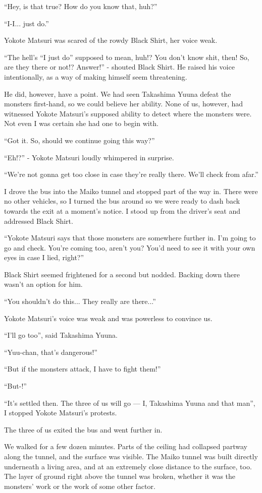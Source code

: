 ``Hey, is that true? How do you know that, huh?''

``I-I... just do.''

Yokote Matsuri was scared of the rowdy Black Shirt, her voice weak.

``The hell's ``I just do'' supposed to mean, huh!? You don't know shit, then! So, are they there or not!? Answer!'' - shouted Black Shirt. He raised his voice intentionally, as a way of making himself seem threatening.

He did, however, have a point. We had seen Takashima Yuuna defeat the monsters first-hand, so we could believe her ability. None of us, however, had witnessed Yokote Matsuri's supposed ability to detect where the monsters were. Not even I was certain she had one to begin with.

``Got it. So, should we continue going this way?''

``Eh!?'' - Yokote Matsuri loudly whimpered in surprise.

``We're not gonna get too close in case they're really there. We'll check from afar.''

I drove the bus into the Maiko tunnel and stopped part of the way in. There were no other vehicles, so I turned the bus around so we were ready to dash back towards the exit at a moment's notice. I stood up from the driver's seat and addressed Black Shirt.

``Yokote Matsuri says that those monsters are somewhere further in. I'm going to go and check. You're coming too, aren't you? You'd need to see it with your own eyes in case I lied, right?''

Black Shirt seemed frightened for a second but nodded. Backing down there wasn't an option for him.

``You shouldn't do this... They really are there...''

Yokote Matsuri's voice was weak and was powerless to convince us.

``I'll go too'', said Takashima Yuuna.

``Yuu-chan, that's dangerous!''

``But if the monsters attack, I have to fight them!''

``But-!''

``It's settled then. The three of us will go --- I, Takashima Yuuna and that man'', I stopped Yokote Matsuri's protests.

The three of us exited the bus and went further in.

We walked for a few dozen minutes. Parts of the ceiling had collapsed partway along the tunnel, and the surface was visible. The Maiko tunnel was built directly underneath a living area, and at an extremely close distance to the surface, too. The layer of ground right above the tunnel was broken, whether it was the monsters' work or the work of some other factor.


